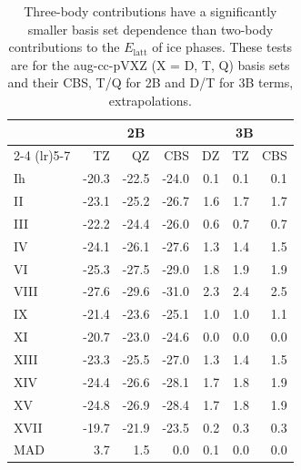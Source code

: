 \begin{table}[h]

\caption{\label{tab:2b_3b_basis_conv}Three-body contributions have a significantly smaller basis set dependence than two-body contributions to the $E_\text{latt}$ of ice phases. These tests are for the aug-cc-pVXZ (X = D, T, Q) basis sets and their CBS, T/Q for 2B and D/T for 3B terms, extrapolations.}
\begin{tabular}{lrrrrrr}
\toprule
 & \multicolumn{3}{c}{2B} & \multicolumn{3}{c}{3B} \\ \cmidrule(lr){2-4} \cmidrule(lr){5-7} 
 & TZ & QZ & CBS & DZ & TZ & CBS \\
\midrule
Ih & -20.3 & -22.5 & -24.0 & 0.1 & 0.1 & 0.1 \\
II & -23.1 & -25.2 & -26.7 & 1.6 & 1.7 & 1.7 \\
III & -22.2 & -24.4 & -26.0 & 0.6 & 0.7 & 0.7 \\
IV & -24.1 & -26.1 & -27.6 & 1.3 & 1.4 & 1.5 \\
VI & -25.3 & -27.5 & -29.0 & 1.8 & 1.9 & 1.9 \\
VIII & -27.6 & -29.6 & -31.0 & 2.3 & 2.4 & 2.5 \\
IX & -21.4 & -23.6 & -25.1 & 1.0 & 1.0 & 1.1 \\
XI & -20.7 & -23.0 & -24.6 & 0.0 & 0.0 & 0.0 \\
XIII & -23.3 & -25.5 & -27.0 & 1.3 & 1.4 & 1.5 \\
XIV & -24.4 & -26.6 & -28.1 & 1.7 & 1.8 & 1.9 \\
XV & -24.8 & -26.9 & -28.4 & 1.7 & 1.8 & 1.9 \\
XVII & -19.7 & -21.9 & -23.5 & 0.2 & 0.3 & 0.3 \\
\midrule MAD & 3.7 & 1.5 & 0.0 & 0.1 & 0.0 & 0.0 \\
\bottomrule
\end{tabular}

\end{table}